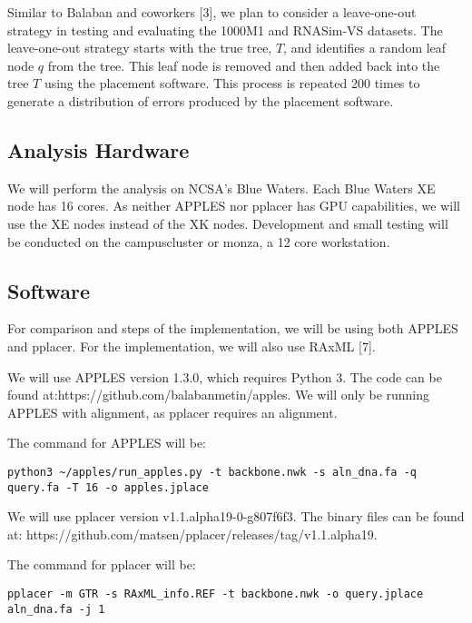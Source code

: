 \documentclass[11pt]{article}
\begin{document}
Similar to Balaban and coworkers {[}3{]}, we plan to consider a
leave-one-out strategy in testing and evaluating the 1000M1 and
RNASim-VS datasets. The leave-one-out strategy starts with the true
tree, \(T\), and identifies a random leaf node \(q\) from the tree. This
leaf node is removed and then added back into the tree \(T\) using the
placement software. This process is repeated 200 times to generate a
distribution of errors produced by the placement software.

\subsection{Analysis Hardware}

We will perform the analysis on NCSA's Blue Waters. Each Blue Waters XE
node has 16 cores. As neither APPLES nor pplacer has GPU capabilities,
we will use the XE nodes instead of the XK nodes. Development and small
testing will be conducted on the campuscluster or monza, a 12 core
workstation.

\subsection{Software}

For comparison and steps of the implementation, we will be using both
APPLES and pplacer. For the implementation, we will also use RAxML
{[}7{]}.

We will use APPLES version 1.3.0, which requires Python 3. The code can
be found at:\newline https://github.com/balabanmetin/apples. We will
only be running APPLES with alignment, as pplacer requires an alignment.

The command for APPLES will be:

\begin{verbatim}
python3 ~/apples/run_apples.py -t backbone.nwk -s aln_dna.fa -q query.fa -T 16 -o apples.jplace
\end{verbatim}

We will use pplacer version v1.1.alpha19-0-g807f6f3. The binary files
can be found at:\newline
https://github.com/matsen/pplacer/releases/tag/v1.1.alpha19.

The command for pplacer will be:

\begin{verbatim}
pplacer -m GTR -s RAxML_info.REF -t backbone.nwk -o query.jplace aln_dna.fa -j 1
\end{verbatim}
\end{document}
